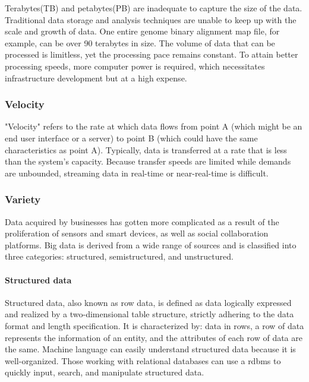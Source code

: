 Terabytes(TB) and petabytes(PB) are inadequate to capture the size of the data. Traditional data storage and analysis techniques are unable to keep up with the scale and growth of data\cite[p.~17]{10.5555/2132803}. One entire genome binary alignment map file, for example, can be over 90 terabytes in size\cite{three_v}. The volume of data that can be processed is limitless, yet the processing pace remains constant. To attain better processing speeds, more computer power is required, which necessitates infrastructure development but at a high expense\cite{tole2013big}.

\subsubsection{Velocity}
"Velocity" refers to the rate at which data flows from point A (which might be an end user interface or a server) to point B (which could have the same characteristics as point A). Typically, data is transferred at a rate that is less than the system's capacity. Because transfer speeds are limited while demands are unbounded, streaming data in real-time or near-real-time is difficult\cite{tole2013big}.

\subsubsection{Variety}

Data acquired by businesses has gotten more complicated as a result of the proliferation of sensors and smart devices, as well as social collaboration platforms\cite{three_v}. Big data is derived from a wide range of sources and is classified into three categories: structured, semistructured, and unstructured\cite[p.~17]{10.5555/2132803}.

\paragraph{Structured data}

Structured data, also known as row data, is defined as data logically expressed and realized by a two-dimensional table structure, strictly adhering to the data format and length specification. It is characterized by: data in rows, a row of data represents the information of an entity, and the attributes of each row of data are the same. Machine language can easily understand structured data because it is well-organized. Those working with relational databases can use a \ac{rdbms} to quickly input, search, and manipulate structured data\cite{structured_data}.


